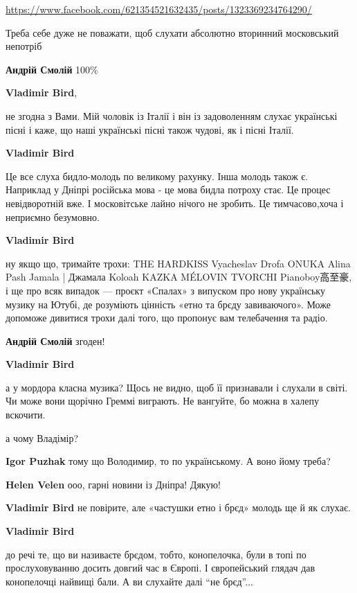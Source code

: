 \begin{itemize}
\begin{itemize}
\url{https://www.facebook.com/621354521632435/posts/1323369234764290/}

Треба себе дуже не поважати, щоб слухати абсолютно вторинний московський непотріб

\textbf{Андрій Смолій} 100\%

\textbf{Vladimir Bird},

не згодна з Вами. Мій чоловік із Італії і він із задоволенням слухає українські
пісні і каже, що наші українські пісні також чудові, як і пісні Італії.

\textbf{Vladimir Bird} 

Це все слуха бидло-молодь по великому рахунку. Інша молодь також є. Наприклад у
Дніпрі російська мова - це мова бидла потроху стає. Це процес невідворотній вже.
І московітське лайно нічого не зробить. Це тимчасово,хоча і неприємно
безумовно.

\textbf{Vladimir Bird} 

ну якщо що, тримайте трохи: THE HARDKISS Vyacheslav Drofa ONUKA Alina Pash
Jamala | Джамала Koloah KAZKA MÉLOVIN TVORCHI Pianoboy高至豪, і ще про всяк
випадок — проєкт «Спалах» з випуском про нову українську музику на Ютубі, де
розуміють цінність «етно та брєду завиваючого». Може допоможе дивитися трохи
далі того, що пропонує вам телебачення та радіо.

\textbf{Андрій Смолій} згоден!

\textbf{Vladimir Bird} 

а у мордора класна музика? Щось не видно, щоб її признавали і слухали в світі.
Чи може вони щорічно Греммі виграють. Не вангуйте, бо можна в халепу вскочити.

а чому Владімір?

\textbf{Igor Puzhak} тому що Володимир, то по українському. А воно йому треба?

\textbf{Helen Velen} ооо, гарні новини із Дніпра! Дякую!

\textbf{Vladimir Bird} не повірите, але «частушки етно і брєд» молодь ще й як слухає.

\textbf{Vladimir Bird} 

до речі те, що ви називаєте брєдом, тобто, конопелочка, були в топі по
прослуховуванню досить довгий час в Європі. І європейський глядач дав
конопелочці найвищі бали. А ви слухайте далі \enquote{не брєд}...



\end{itemize}
\end{itemize}
